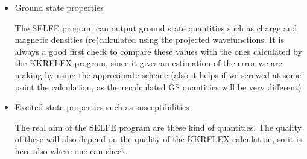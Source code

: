 \documentclass[11pt,fleqn]{book} %
\begin{document}
\begin{itemize}
\item  Ground state properties

The SELFE program can output ground state quantities such as charge and magnetic densities
(re)calculated using the projected wavefunctions. It is always a good first check to
compare these values with the ones calculated by the KKRFLEX program, since it gives
an estimation of the error we are making by using the approximate scheme (also it helps
if we screwed at some point the calculation, as the recalculated
GS quantities will be very different)

\item Excited state properties such as susceptibilities

The real aim of the SELFE program are these kind of quantities. The quality of
these will also depend on the quality of the KKRFLEX calculation, so it is here
also where one can check.

\end{itemize}
\end{document}
